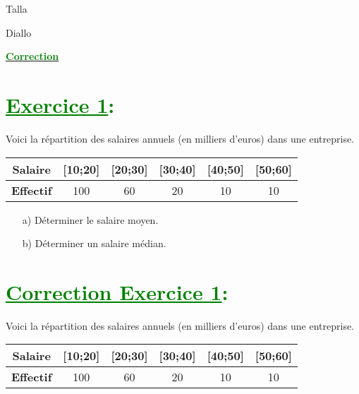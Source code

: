 \documentclass[12pt]{article}
\begin{document}
\begin{minipage}{0.8\textwidth}
	Talla                        
\end{minipage}
\begin{minipage}{0.8\textwidth}
	Diallo 
\end{minipage}

\begin{center}
\textbf{{\underline{\textcolor{green}{Correction}}}}
\end{center}
\section*{\textcolor{green}{\underline{Exercice 1}:}}

Voici la répartition des salaires annuels (en milliers d'euros) dans une entreprise.

\begin{tabular}{|c|c|c|c|c|c|}
  \hline
  \textbf{Salaire} & [10;20] & [20;30] & [30;40] & [40;50] & [50;60]\\
  \hline
    \textbf{Effectif}& 100 & 60 & 20 & 10 & 10\\
  \hline
\end{tabular}

\begin{enumerate}
  \item[a)] Déterminer le salaire moyen.
  \item[b)] Déterminer un salaire médian.
\end{enumerate}

\section*{\textcolor{green}{\underline{Correction Exercice 1}:}}

Voici la répartition des salaires annuels (en milliers d'euros) dans une entreprise.

\begin{tabular}{|c|c|c|c|c|c|}
  \hline
  \textbf{Salaire} & [10;20] & [20;30] & [30;40] & [40;50] & [50;60]\\
  \hline
  \textbf{Effectif} & 100 & 60 & 20 & 10 & 10\\
  \hline
\end{tabular}
\end{document}
